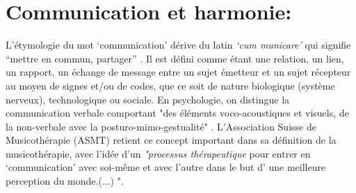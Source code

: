 \section{Communication et harmonie: }
L'étymologie du mot `communication' dérive du latin  \textit{`cum
  municare'} qui signifie ``mettre en commun, partager'' \autocite{dicpetitrobert}.
Il est défini comme étant une
relation, un lien, un rapport, un échange de message entre un sujet émetteur et un
sujet récepteur au moyen de signes et/ou de codes, que ce soit de nature biologique (système nerveux), technologique ou sociale. En psychologie, on distingue la communication verbale comportant "des éléments voco-acoustiques et visuels, de la non-verbale avec la posturo-mimo-gestualité" \autocite{doronparot}.
L'Association Suisse
de Musicothérapie (ASMT) retient ce concept important dans sa définition de la musicothérapie, avec 
l'idée  d'un\textit{ "processus thérapeutique }pour entrer en `communication' avec soi-même et avec
l'autre dans le but d' une meilleure perception du
monde.(...) "\autocite{site_musitherapy}.

